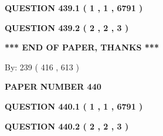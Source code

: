 \documentclass[12pt]{article}
\begin{document}
 
 
 
   
   
  
\vspace{0.2in}
  
{\textbf{\Large{QUESTION
439.1 
 ( 1 , 1 , 6791 )
}}}
  
  
  
\vspace{0.2in}
  
{\textbf{\Large{QUESTION
439.2 
 ( 2 , 2 , 3 )
}}}
  
  
   
   
 \vspace{0.2in}
 
   
   
   
   
\vspace{1.0in} 
{\textbf{\large{ *** END OF PAPER, THANKS *** }}} 
   
   
\hspace{1.0in} By: 
 239 ( 416 ,  613 )
   
   
   
   
\newpage 
\setcounter{page}{ 
   440001 } 
   
   
   
   
 {\textbf{ \Large{ PAPER NUMBER  440  }}}
   
   
\vspace{0.2in}
   
   
   
   
   
   
 \vspace{0.2in}
 
 
 
 
   
   
  
\vspace{0.2in}
  
{\textbf{\Large{QUESTION
440.1 
 ( 1 , 1 , 6791 )
}}}
  
  
  
\vspace{0.2in}
  
{\textbf{\Large{QUESTION
440.2 
 ( 2 , 2 , 3 )
}}}
  
  
   
   
 \vspace{0.2in}
 
   
   
   
   
\end{document}
